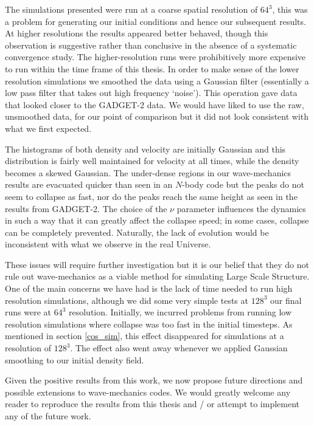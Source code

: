 The simulations presented were run at a coarse spatial resolution of $64^3$, this was a problem for generating our initial conditions and hence our subsequent results. At higher resolutions the results appeared better behaved, though this observation is suggestive rather than conclusive in the absence of a systematic convergence study. The higher-resolution runs were prohibitively more expensive to run within the time frame of this thesis. In order to make sense of the lower resolution simulations we smoothed the data using a Gaussian filter (essentially a low pass filter that takes out high frequency `noise'). This operation gave data that looked closer to the GADGET-2 data. We would have liked to use the raw, unsmoothed data, for our point of comparison but it did not look consistent with what we first expected.

The histograms of both density and velocity are initially Gaussian and this distribution is fairly well maintained for velocity at all times, while the density becomes a skewed Gaussian. The under-dense regions in our wave-mechanics results are evacuated quicker than seen in an $N$-body code but the peaks do not seem to collapse as fast, nor do the peaks reach the same height as seen in the results from GADGET-2. The choice of the $\nu$ parameter influences the dynamics in such a way that it can greatly affect the collapse speed; in some cases, collapse can be completely prevented. Naturally, the lack of evolution would be inconsistent with what we observe in the real Universe.

These issues will require further investigation but it is our belief that they do not rule out wave-mechanics as a viable method for simulating Large Scale Structure. One of the main concerns we have had is the lack of time needed to run high resolution simulations, although we did some very simple tests at $128^3$ our final runs were at $64^3$ resolution. Initially, we incurred problems from running low resolution simulations where collapse was too fast in the initial timesteps. As mentioned in section \ref{cos_sim}, this effect disappeared for simulations at a resolution of $128^3$. The effect also went away whenever we applied Gaussian smoothing to our initial density field.

Given the positive results from this work, we now propose future directions and possible extensions to wave-mechanics codes. We would greatly welcome any reader to reproduce the results from this thesis and / or attempt to implement any of the future work.

